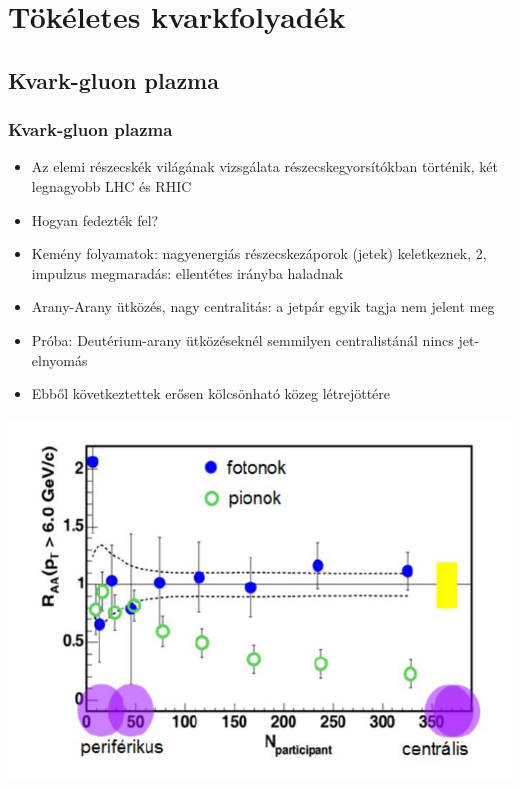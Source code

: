 \documentclass{beamer}
\begin{document}
\section{Tökéletes kvarkfolyadék}
\subsection{Kvark-gluon plazma}
\begin{frame}
\frametitle{Kvark-gluon plazma}
\begin{itemize}
\item Az elemi részecskék világának vizsgálata részecskegyorsítókban történik, két legnagyobb LHC és RHIC
\item Hogyan fedezték fel?
\item Kemény folyamatok: nagyenergiás részecskezáporok (jetek) keletkeznek, 2, impulzus megmaradás: ellentétes irányba haladnak
\item Arany-Arany ütközés, nagy centralitás: a jetpár egyik tagja nem jelent meg
\item Próba: Deutérium-arany ütközéseknél semmilyen centralistánál nincs jet-elnyomás
\item Ebből következtettek erősen kölcsönható közeg létrejöttére
\end{itemize}
\end{frame}

\begin{frame}
\begin{center}
\includegraphics[scale=0.5]{pic/p1}
\end{center}
\end{frame}
\end{document}
